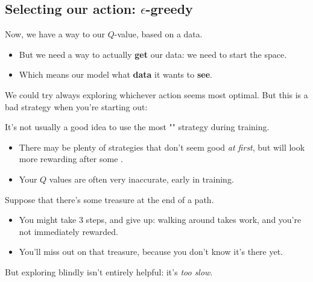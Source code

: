     \subsection{Selecting our action: $\epsilon$-greedy}

        Now, we have a way to  our $Q$-value, based on a data. 

        \begin{itemize}
            \item But we need a way to actually \textbf{get} our data: we need to start  the space. 
            
            \item Which means our model  what \textbf{data} it wants to \textbf{see}.
        \end{itemize}

        We could try always exploring whichever action seems most optimal. But this is a bad strategy when you're starting out:\\ 

        \begin{concept}
            It's not usually a good idea to  use the most "" strategy during training.

            \begin{itemize}
                \item There may be plenty of strategies that don't seem good \textit{at first}, but will look more rewarding after some .

                \item Your $Q$ values are often very inaccurate, early in training.
            \end{itemize}
        \end{concept}

        \miniex Suppose that there's some treasure at the end of a path.

        \begin{itemize}
            \item You might take 3 steps, and give up: walking around takes work, and you're not immediately rewarded.
            \item You'll miss out on that treasure, because you don't know it's there yet.
        \end{itemize}

        But exploring blindly isn't entirely helpful: it's \textit{too slow}. 
        

